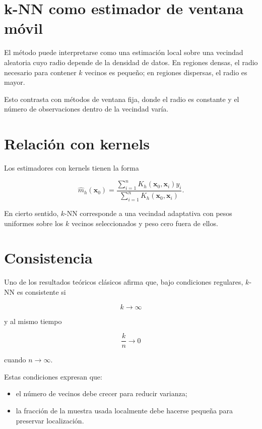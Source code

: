 \documentclass[
  spanish,
  11pt,
  letterpaper,
  DIV=11,
  numbers=noendperiod]{scrreprt}
\providecommand{\tightlist}{%
  \setlength{\itemsep}{0pt}\setlength{\parskip}{0pt}}
\theoremstyle{definition}
\theoremstyle{plain}
\theoremstyle{definition}
\theoremstyle{remark}
\begin{document}
\section{k-NN como estimador de ventana
móvil}\label{k-nn-como-estimador-de-ventana-muxf3vil}

El método puede interpretarse como una estimación local sobre una
vecindad aleatoria cuyo radio depende de la densidad de datos. En
regiones densas, el radio necesario para contener \(k\) vecinos es
pequeño; en regiones dispersas, el radio es mayor.

Esto contrasta con métodos de ventana fija, donde el radio es constante
y el número de observaciones dentro de la vecindad varía.

\section{Relación con kernels}\label{relaciuxf3n-con-kernels}

Los estimadores con kernels tienen la forma

\[
\widehat{m}_h(\mathbf{x}_0)
=
\frac{
\sum_{i=1}^{n} K_h(\mathbf{x}_0,\mathbf{x}_i) y_i
}{
\sum_{i=1}^{n} K_h(\mathbf{x}_0,\mathbf{x}_i)
}.
\]

En cierto sentido, \(k\)-NN corresponde a una vecindad adaptativa con
pesos uniformes sobre los \(k\) vecinos seleccionados y peso cero fuera
de ellos.

\section{Consistencia}\label{consistencia-1}

Uno de los resultados teóricos clásicos afirma que, bajo condiciones
regulares, \(k\)-NN es consistente si

\[
k\to\infty
\]

y al mismo tiempo

\[
\frac{k}{n}\to 0
\]

cuando \(n\to\infty\).

Estas condiciones expresan que:

\begin{itemize}
\tightlist
\item
  el número de vecinos debe crecer para reducir varianza;
\item
  la fracción de la muestra usada localmente debe hacerse pequeña para
  preservar localización.
\end{itemize}
\end{document}
